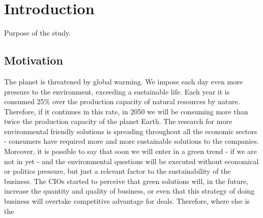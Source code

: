 


\chapter{Introduction} \label{chap1:introduction}
Purpose of the study.

\section{Motivation} \label{sec1:motivation}

    The planet is threatened by global warming. We impose each day even more pressure to the environment, exceeding a sustainable life. Each year it is consumed 25\% over the production capacity of natural resources by nature. Therefore, if it continues in this rate, in 2050 we will be consuming more than twice the production capacity of the planet Earth\cite{Townsend:2002:2050}. 
    The research for more environmental friendly solutions is spreading throughout all the economic sectors - consumers have required more and more sustainable solutions to the companies. Moreover, it is possible to say that soon we will enter in a green trend - if we are not in yet - and the environmental questions will be executed without economical or politics pressure, but just a relevant factor to the sustainability of the business. The CIOs started to perceive that green solutions will, in the future, increase the quantity and quality of business, or even that this strategy of doing business will overtake competitive advantage for deals.
    Therefore, where else is the 
    
